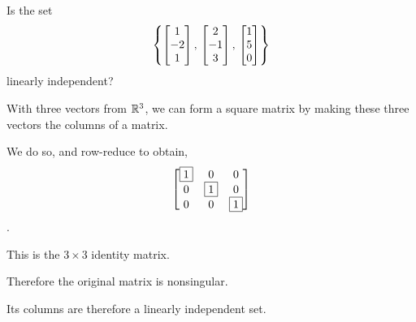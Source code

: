 \documentclass{ximera}
\author{Robert Beezer}
\begin{document}
\begin{exercise}
  Is the set 
  \[
    \left\{\begin{bmatrix}1\\-2\\1\end{bmatrix},\,\begin{bmatrix}2\\-1\\3\end{bmatrix},\,\begin{bmatrix}1\\5\\0\end{bmatrix}\right\}
  \]
  linearly independent?

  \begin{hint}
    With three vectors from $\mathbb{R}^{3}$, we can form a square matrix by
    making these three vectors the columns of a matrix.
  \end{hint}

  \begin{hint}
    We do so, and row-reduce to obtain,
    \[
      \begin{bmatrix}
        \fbox{1} & 0 & 0\\
        0 & \fbox{1} & 0\\
        0 & 0 & \fbox{1}
      \end{bmatrix}
    \].
  \end{hint}
  
  \begin{hint}
    This is the $3\times 3$ identity matrix.
  \end{hint}

  \begin{hint}
    Therefore the original matrix is nonsingular.
  \end{hint}
  
  \begin{hint}
    Its columns are therefore a linearly independent set.
  \end{hint}
    
  \begin{multipleChoice}
  \end{multipleChoice}

\end{exercise}
\end{document}
